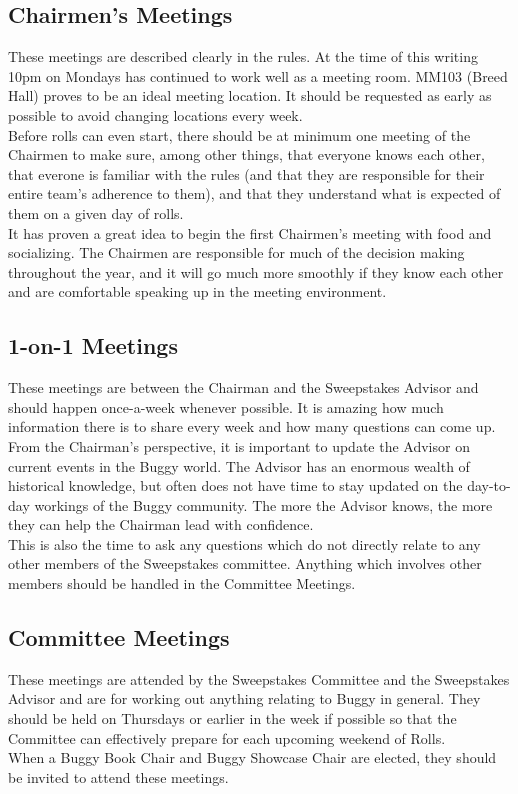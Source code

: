 \subsection{Chairmen's Meetings}
These meetings are described clearly in the rules. At the time of this
writing 10pm on Mondays has continued to work well as a meeting room. MM103
(Breed Hall) proves to be an ideal meeting location. It should be requested
as early as possible to avoid changing locations every week.
\\
Before rolls can even start, there should be at minimum one meeting of the
Chairmen to make sure, among other things, that everyone knows each other, that
everone is familiar with the rules (and that they are responsible for their
entire team's adherence to them), and that they understand what is expected
of them on a given day of rolls.
\\
It has proven a great idea to begin the first Chairmen's meeting with food
and socializing. The Chairmen are responsible for much of the decision making
throughout the year, and it will go much more smoothly if they know each
other and are comfortable speaking up in the meeting environment.

\subsection{1-on-1 Meetings}
These meetings are between the Chairman and the Sweepstakes Advisor and should
happen once-a-week whenever possible. It is amazing how much information
there is to share every week and how many questions can come up.
\\
From the Chairman's perspective, it is important to update the Advisor on
current events in the Buggy world. The Advisor has an enormous wealth of
historical knowledge, but often does not have time to stay updated on the
day-to-day workings of the Buggy community. The more the Advisor knows,
the more they can help the Chairman lead with confidence.
\\
This is also the time to ask any questions which do not directly relate to
any other members of the Sweepstakes committee. Anything which involves other
members should be handled in the Committee Meetings.

\subsection{Committee Meetings}
These meetings are attended by the Sweepstakes Committee and the Sweepstakes
Advisor and are for working out anything relating to Buggy in general. They
should be held on Thursdays or earlier in the week if possible so that the
Committee can effectively prepare for each upcoming weekend of Rolls.
\\
When a Buggy Book Chair and Buggy Showcase Chair are elected, they should be
invited to attend these meetings.

